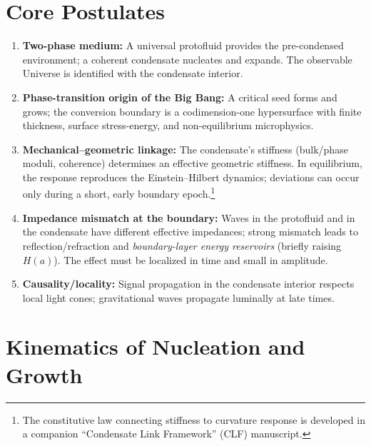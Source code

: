 \documentclass[11pt,a4paper]{article}
\begin{document}
\section{Core Postulates}
\label{sec:postulates}
\begin{enumerate}[label=\textbf{P\arabic*:}, leftmargin=2.2em]
\item \textbf{Two-phase medium:} A universal protofluid provides the pre-condensed environment; a coherent condensate nucleates and expands. The observable Universe is identified with the condensate interior.
\item \textbf{Phase-transition origin of the Big Bang:} A critical seed forms and grows; the conversion boundary is a codimension-one hypersurface with finite thickness, surface stress-energy, and non-equilibrium microphysics.
\item \textbf{Mechanical--geometric linkage:} The condensate’s stiffness (bulk/phase moduli, coherence) determines an effective geometric stiffness. In equilibrium, the response reproduces the Einstein–Hilbert dynamics; deviations can occur only during a short, early boundary epoch.\footnote{The constitutive law connecting stiffness to curvature response is developed in a companion ``Condensate Link Framework'' (CLF) manuscript.}
\item \textbf{Impedance mismatch at the boundary:} Waves in the protofluid and in the condensate have different effective impedances; strong mismatch leads to reflection/refraction and \emph{boundary-layer energy reservoirs} (briefly raising $H(a)$). The effect must be localized in time and small in amplitude.
\item \textbf{Causality/locality:} Signal propagation in the condensate interior respects local light cones; gravitational waves propagate luminally at late times.
\end{enumerate}

\section{Kinematics of Nucleation and Growth}
\end{document}

